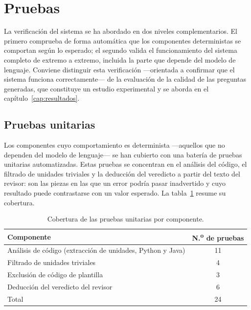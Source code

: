 \section{Pruebas}
\label{sec:pruebas}

La verificación del sistema se ha abordado en dos niveles complementarios.
El primero comprueba de forma automática que los componentes deterministas
se comportan según lo esperado; el segundo valida el funcionamiento del
sistema completo de extremo a extremo, incluida la parte que depende del
modelo de lenguaje. Conviene distinguir esta verificación ---orientada a
confirmar que el sistema funciona correctamente--- de la evaluación de la
calidad de las preguntas generadas, que constituye un estudio experimental
y se aborda en el capítulo~\ref{cap:resultados}.

\subsection{Pruebas unitarias}
\label{sec:pruebas-unitarias}

Los componentes cuyo comportamiento es determinista ---aquellos que no
dependen del modelo de lenguaje--- se han cubierto con una batería de
pruebas unitarias automatizadas. Estas pruebas se concentran en el análisis
del código, el filtrado de unidades triviales y la deducción del veredicto
a partir del texto del revisor: son las piezas en las que un error podría
pasar inadvertido y cuyo resultado puede contrastarse con un valor
esperado. La tabla~\ref{tab:pruebas-unitarias} resume su cobertura.

\begin{table}[htbp]
  \centering
  \caption{Cobertura de las pruebas unitarias por componente.}
  \label{tab:pruebas-unitarias}
  \begin{tabular}{lc}
    \toprule
    Componente & N.\textsuperscript{o} de pruebas \\
    \midrule
    Análisis de código (extracción de unidades, Python y Java) & 11 \\
    Filtrado de unidades triviales                    & 4 \\
    Exclusión de código de plantilla                  & 3 \\
    Deducción del veredicto del revisor               & 6 \\
    \midrule
    Total                                             & 24 \\
    \bottomrule
  \end{tabular}
\end{table}

